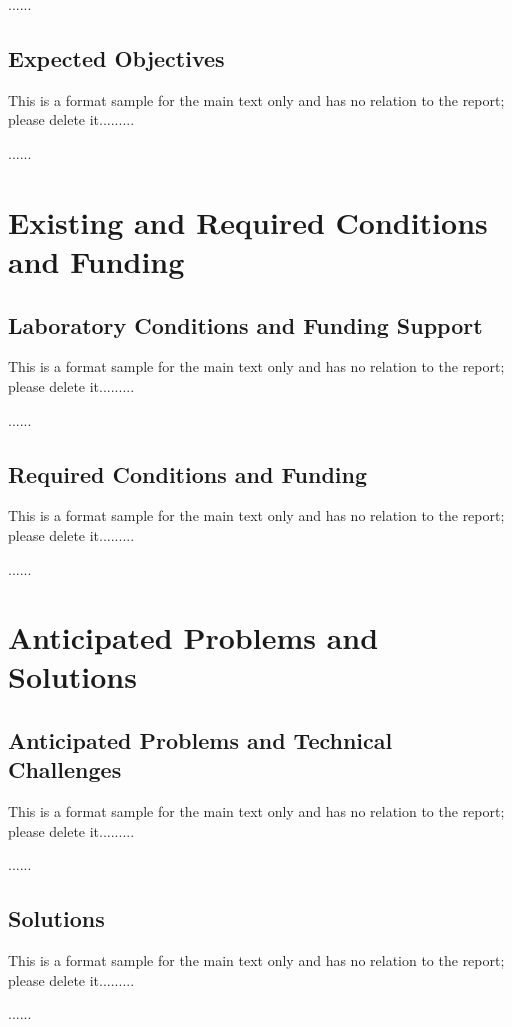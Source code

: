 ......

\hitenter

\subsection{Expected Objectives}

This is a format sample for the main text only and has no relation to the report; please delete it.........

......

\section{Existing and Required Conditions and Funding}

\subsection{Laboratory Conditions and Funding Support}

This is a format sample for the main text only and has no relation to the report; please delete it.........

......

\subsection{Required Conditions and Funding}

This is a format sample for the main text only and has no relation to the report; please delete it.........

......

\section{Anticipated Problems and Solutions}

\subsection{Anticipated Problems and Technical Challenges}

This is a format sample for the main text only and has no relation to the report; please delete it.........

......

\subsection{Solutions}

This is a format sample for the main text only and has no relation to the report; please delete it.........

......

\nocite{*}
